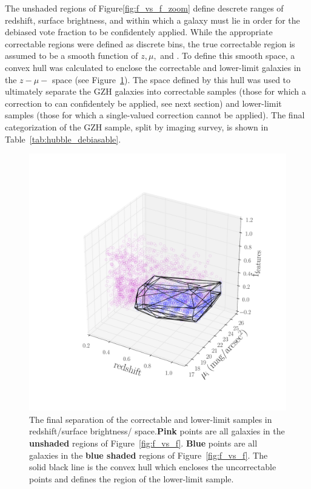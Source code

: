 The unshaded regions of Figure\ref{fig:f_vs_f_zoom} define descrete ranges of redshift, surface brightness, and \ffeatures{} within which a galaxy must lie in order for the debiased vote fraction to be confidentely applied. While the appropriate correctable regions were defined as discrete bins, the true correctable region is assumed to be a smooth function of $z, \mu,$ and \ffeatures{}. To define this smooth space, a convex hull was calculated to enclose the correctable and lower-limit \ferengi{} galaxies in the $z-\mu-$\ffeatures{} space (see Figure~\ref{fig:hull}). The space defined by this hull was used to ultimately separate the GZH galaxies into correctable samples (those for which a correction to \ffeatures{} can confidentely be applied, see next section) and lower-limit samples (those for which a single-valued correction cannot be applied). The final categorization of the GZH sample, split by imaging survey, is shown in Table~\ref{tab:hubble_debiasable}. 
\begin{figure}
\centering
\includegraphics[width=\textwidth]{figures/convex_hull.pdf}
\caption{The final separation of the correctable and lower-limit samples in redshift/surface brightness/\ffeatures{} space.\textbf{Pink} points are all \ferengi{} galaxies in the \textbf{unshaded} regions of Figure~\ref{fig:f_vs_f}. \textbf{Blue} points are all \ferengi{} galaxies in the \textbf{blue shaded} regions of Figure~\ref{fig:f_vs_f}. The solid black line is the convex hull which encloses the uncorrectable points and defines the region of the lower-limit sample. }
\label{fig:hull}
\end{figure}



